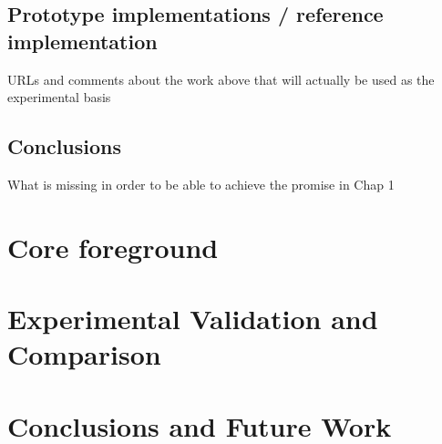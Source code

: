 \documentclass[12pt,a4paper]{report}
\begin{document}
	\section{Prototype implementations / reference implementation}
	\label{sec:bg:code}
	
	URLs and comments about the work above that will actually be used as 
	the experimental basis
	\\
	
	\section{Conclusions}
	\label{sec:bg:concl}
	
	What is missing in order to be able to achieve the promise in Chap 1
	
	
	\chapter{Core foreground}
	\label{sec:fg}
	
	\chapter{Experimental Validation and Comparison}
	\label{sec:exp}
	
	\chapter{Conclusions and Future Work}
	\label{sec:concl}
	
	\renewcommand{\bibname}{References}
	
	
\end{document}
